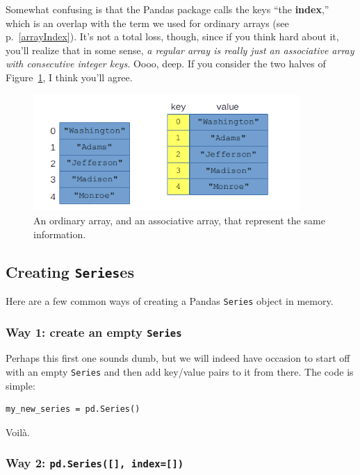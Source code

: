 Somewhat confusing is that the Pandas package calls the keys ``the
\textbf{index},'' which is an overlap with the term we used for ordinary arrays
(see p.~\ref{arrayIndex}). It's not a total loss, though, since if you think
hard about it, you'll realize that in some sense, \textit{a regular array is
really just an associative array with consecutive integer keys.} Oooo, deep. If
you consider the two halves of Figure~\ref{fig:assocArraysAreArrays}, I think
you'll agree.

\begin{figure}[ht]
\centering
\includegraphics[width=0.9\textwidth]{assocArraysAreArrays.png}
\caption{An ordinary array, and an associative array, that represent the same
information.}
\label{fig:assocArraysAreArrays}
\end{figure}


\subsection{Creating \texttt{Series}es}

Here are a few common ways of creating a Pandas \texttt{Series} object in
memory.

\subsubsection{Way 1: create an empty \texttt{Series}}

Perhaps this first one sounds dumb, but we will indeed have occasion to start
off with an empty \texttt{Series} and then add key/value pairs to it from
there. The code is simple:

\begin{Verbatim}[fontsize=\small,samepage=true,frame=single,framesep=3mm]
my_new_series = pd.Series()
\end{Verbatim}

Voil\`{a}.

\subsubsection{Way 2: \texttt{pd.Series([], index=[])}}

